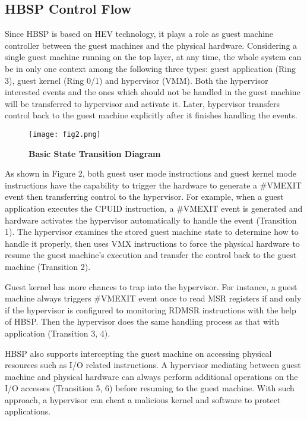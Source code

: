 \documentclass[conference]{IEEEtran}
\begin{document}
\subsection{HBSP Control Flow}
Since HBSP is based on HEV technology, it plays a role as guest
machine controller between the guest machines and the physical
hardware. Considering a single guest machine running on the top
layer, at any time, the whole system can be in only one context
among the following three types: guest application (Ring 3), guest
kernel (Ring 0/1) and hypervisor (VMM). Both the hypervisor
interested events and the ones which should not be handled in the
guest machine will be transferred to hypervisor and activate it.
Later, hypervisor transfers control back to the guest machine
explicitly after it finishes handling the events.

\begin{figure}[!htb]
\begin{center}
\texttt{[image: fig2.png]}
\end{center}
\caption{{\bf Basic State Transition Diagram}} \label{Figure 2.}
\end{figure}

As shown in Figure 2, both guest user mode instructions and guest
kernel mode instructions have the capability to trigger the hardware
to generate a \#VMEXIT event then transferring control to the
hypervisor. For example, when a guest application executes the CPUID
instruction, a \#VMEXIT event is generated and hardware activates
the hypervisor automatically to handle the event (Transition 1). The
hypervisor examines the stored guest machine state to determine how
to handle it properly, then uses VMX instructions to force the
physical hardware to resume the guest machine's execution and
transfer the control back to the guest machine (Transition 2).

Guest kernel has more chances to trap into the hypervisor. For
instance, a guest machine always triggers \#VMEXIT event once to
read MSR registers if and only if the hypervisor is configured to
monitoring RDMSR instructions with the help of HBSP. Then the
hypervisor does the same handling process as that with application
(Transition 3, 4).

HBSP also supports intercepting the guest machine on accessing
physical resources such as I/O related instructions. A hypervisor
mediating between guest machine and physical hardware can always
perform additional operations on the I/O accesses (Transition 5, 6)
before resuming to the guest machine. With such approach, a
hypervisor can cheat a malicious kernel and software to protect
applications.
\end{document}
